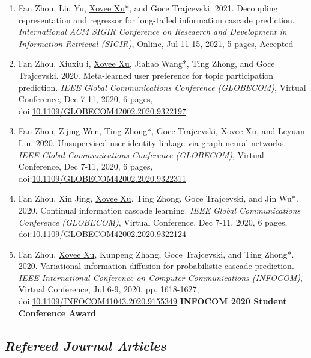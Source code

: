 \begin{enumerate}
    \item Fan Zhou, Liu Yu, \underline{Xovee Xu}*, and Goce Trajcevski. 2021. Decoupling representation and regressor for long-tailed information cascade prediction. \textit{International ACM SIGIR Conference on Reseaerch and Development in Information Retrieval (SIGIR)}, Online, Jul 11-15, 2021, 5 pages, Accepted
    \item Fan Zhou, Xiuxiu \swashQ i, \underline{Xovee Xu}, Jiahao Wang*, Ting Zhong, and Goce Trajcevski. 2020. Meta-learned user preference for topic participation prediction. \textit{IEEE Global Communications Conference (GLOBECOM)}, Virtual Conference, Dec 7-11, 2020, 6 pages, doi:\href{https://doi.org/10.1109/GLOBECOM42002.2020.9322197}{10.1109/GLOBECOM42002.2020.9322197}
    \item Fan Zhou, Zijing Wen, Ting Zhong*, Goce Trajcevski, \underline{Xovee Xu}, and Leyuan Liu. 2020. Unsupervised user identity linkage via graph neural networks. \textit{IEEE Global Communications Conference (GLOBECOM)}, Virtual Conference, Dec 7-11, 2020, 6 pages, doi:\href{https://doi.org/10.1109/GLOBECOM42002.2020.9322311}{10.1109/GLOBECOM42002.2020.9322311}
    \item Fan Zhou, Xin Jing, \underline{Xovee Xu}, Ting Zhong, Goce Trajcevski, and Jin Wu*. 2020. Continual information cascade learning. \textit{IEEE Global Communications Conference (GLOBECOM)}, Virtual Conference, Dec 7-11, 2020, 6 pages, doi:\href{https://doi.org/10.1109/GLOBECOM42002.2020.9322124}{10.1109/GLOBECOM42002.2020.9322124}
    \item Fan Zhou, \underline{Xovee Xu}, Kunpeng Zhang, Goce Trajcevski, and Ting Zhong*. 2020. Variational information diffusion for probabilistic cascade prediction. \textit{IEEE International Conference on Computer Communications (INFOCOM)}, Virtual Conference, Jul 6-9, 2020, pp. 1618-1627, doi:\href{https://doi.org/10.1109/INFOCOM41043.2020.9155349}{10.1109/INFOCOM41043.2020.9155349}
    \newline \textbf{\color{red}INFOCOM 2020 Student Conference Award}
\end{enumerate}

\subsection*{\textnormal{\textit{Refereed Journal Articles}}}

